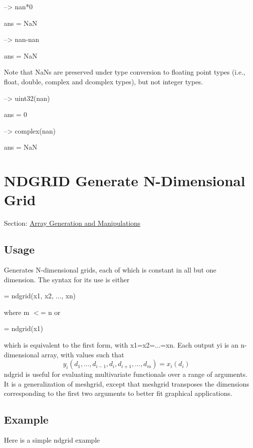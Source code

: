 \begin{DoxyVerbInclude}
--> nan*0

ans = 
 NaN 

--> nan-nan

ans = 
 NaN 
\end{DoxyVerbInclude}


Note that {\ttfamily Na\-N}s are preserved under type conversion to floating point types (i.\-e., {\ttfamily float}, {\ttfamily double}, {\ttfamily complex} and {\ttfamily dcomplex} types), but not integer types.


\begin{DoxyVerbInclude}
--> uint32(nan)

ans = 
 0 

--> complex(nan)

ans = 
 NaN 
\end{DoxyVerbInclude}
 \hypertarget{array_ndgrid}{}\section{N\-D\-G\-R\-I\-D Generate N-\/\-Dimensional Grid}\label{array_ndgrid}
Section\-: \hyperlink{sec_array}{Array Generation and Manipulations} \hypertarget{vtkwidgets_vtkxyplotwidget_Usage}{}\subsection{Usage}\label{vtkwidgets_vtkxyplotwidget_Usage}
Generates N-\/dimensional grids, each of which is constant in all but one dimension. The syntax for its use is either \begin{DoxyVerb}   [y1, y2, ..., ym] = ndgrid(x1, x2, ..., xn)
\end{DoxyVerb}
 where {\ttfamily m $<$= n} or \begin{DoxyVerb}   [y1, y2, ..., ym] = ndgrid(x1)
\end{DoxyVerb}
 which is equivalent to the first form, with {\ttfamily x1=x2=...=xn}. Each output {\ttfamily yi} is an {\ttfamily n}-\/dimensional array, with values such that \[ y_i(d_1,\ldots,d_{i-1},d_{i},d_{i+1},\ldots,d_m) = x_i(d_{i}) \] {\ttfamily ndgrid} is useful for evaluating multivariate functionals over a range of arguments. It is a generalization of {\ttfamily meshgrid}, except that {\ttfamily meshgrid} transposes the dimensions corresponding to the first two arguments to better fit graphical applications. \hypertarget{variables_struct_Example}{}\subsection{Example}\label{variables_struct_Example}
Here is a simple {\ttfamily ndgrid} example


